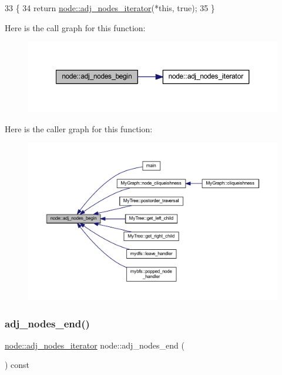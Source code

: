 \begin{DoxyCode}
33 \{ 
34     \textcolor{keywordflow}{return} \mbox{\hyperlink{classnode_a392f19ea6dfa344bdf5c4d5a4b25eb8c}{node::adj\_nodes\_iterator}}(*\textcolor{keyword}{this}, \textcolor{keyword}{true});
35 \}
\end{DoxyCode}
Here is the call graph for this function\+:\nopagebreak
\begin{figure}[H]
\begin{center}
\leavevmode
\includegraphics[width=350pt]{classnode_a6cd2febf910bc6572c4aecba6278b100_cgraph}
\end{center}
\end{figure}
Here is the caller graph for this function\+:\nopagebreak
\begin{figure}[H]
\begin{center}
\leavevmode
\includegraphics[width=350pt]{classnode_a6cd2febf910bc6572c4aecba6278b100_icgraph}
\end{center}
\end{figure}
\mbox{\label{classnode_a2477fa92c56a19d29464082444a3043a}} 
\subsubsection{\texorpdfstring{adj\+\_\+nodes\+\_\+end()}{adj\_nodes\_end()}}
{\footnotesize\ttfamily \mbox{\hyperlink{classnode_a392f19ea6dfa344bdf5c4d5a4b25eb8c}{node\+::adj\+\_\+nodes\+\_\+iterator}} node\+::adj\+\_\+nodes\+\_\+end (\begin{DoxyParamCaption}{ }\end{DoxyParamCaption}) const}

